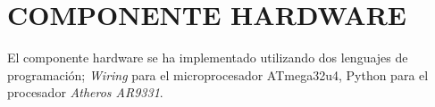 \section{COMPONENTE HARDWARE}

El componente hardware se ha implementado utilizando dos lenguajes de programación; \emph{Wiring} para el microprocesador ATmega32u4, Python para el procesador \emph{Atheros AR9331}.










